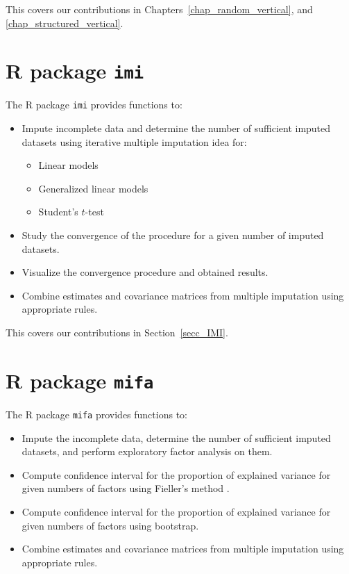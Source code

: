 \documentclass[11pt,a5paper,twoside]{book}
\begin{document}
This covers our contributions in Chapters~\ref{chap_random_vertical}, and \ref{chap_structured_vertical}.


\section{R package {\tt{imi}}}
The R package {\tt{imi}} provides functions to:

\begin{itemize}
\item Impute incomplete data and determine the number of sufficient imputed datasets using iterative multiple imputation idea for:
\vspace{-\topsep}
\begin{itemize}
\item Linear models
\item Generalized linear models
\item Student's $t$-test
\end{itemize}
\vspace{-\topsep}
\item Study the convergence of the procedure for a given number of imputed datasets.
\item Visualize the convergence procedure and obtained results.
\item Combine estimates and covariance matrices from multiple imputation using appropriate rules.
\end{itemize}

This covers our contributions in Section~\ref{secc_IMI}.



\section{R package {\tt{mifa}}}


The R package {\tt{mifa}} provides functions to:

\begin{itemize}
\item Impute the incomplete data, determine the number of sufficient imputed datasets, and perform exploratory factor analysis on them.
\item Compute confidence interval for the proportion of explained variance for given numbers of factors using Fieller's method \citep{fieller1954}.
\item Compute confidence interval for the proportion of explained variance for given numbers of factors using bootstrap.
\item Combine estimates and covariance matrices from multiple imputation using appropriate rules.
\end{itemize}
\end{document}
